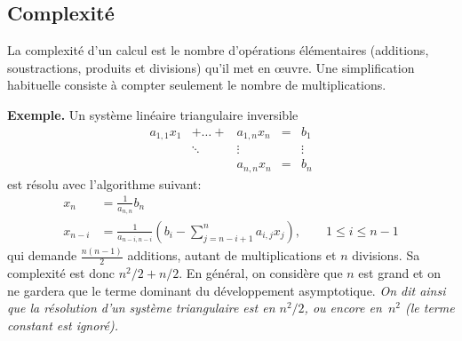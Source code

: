 







\clearpage

\subsection{Complexité}

La complexité d'un calcul est le nombre d'opérations élémentaires (additions,
soustractions,  produits et divisions) qu'il met en œuvre.  Une
simplification habituelle consiste à compter seulement le nombre de
multiplications.

{\bf Exemple.}
Un système linéaire triangulaire inversible
\[
\begin{array}{ccccc}
a_{1,1}x_1  & + \ldots +  & a_{1,n}x_n & = & b_1 \\
& \ddots & \vdots && \vdots \\
&& a_{n,n}x_n & =&  b_n
\end{array}
\]
est résolu avec l'algorithme suivant:
\begin{align*}
x_n & = \frac{1}{a_{n,n}}b_n \\
x_{n-i} & = \frac{1}{a_{n-i,n-i}}\left(
b_i - \sum_{j=n-i+1}^{n} a_{i,j}x_j
\right), \qquad 1 \leq i \leq n-1
\end{align*}
qui demande $\frac{n(n-1)}{2}$ additions, autant de multiplications et $n$
divisions. Sa complexité est donc ${n^2}/{2} + n/2$. En général, on considère
que $n$ est grand et on ne gardera que le terme dominant du développement
asymptotique.
\emph{On dit ainsi que la résolution d'un système triangulaire est en
$n^2/2$, ou encore en~$n^2$ (le terme constant est ignoré).}

